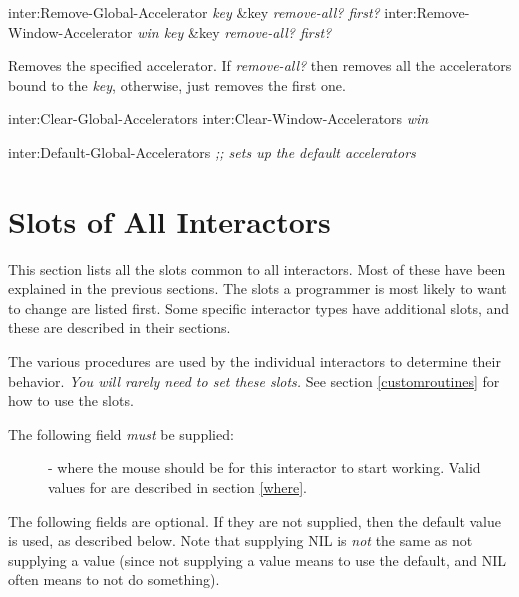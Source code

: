 \begin{programexample}
inter:Remove-Global-Accelerator {\it key} \&key {\it remove-all? first?} \value{function}
inter:Remove-Window-Accelerator {\it win key} \&key {\it remove-all? first?} \value{function}
\end{programexample}
Removes the specified accelerator.  If {\it remove-all?} then removes
all the accelerators bound to the {\it key}, otherwise, just removes the
first one.

\begin{programexample}
inter:Clear-Global-Accelerators \value{function}
inter:Clear-Window-Accelerators {\it win} \value{function}

inter:Default-Global-Accelerators {\it ;; sets up the default accelerators} \value{function}
\end{programexample}



\chapter{Slots of All Interactors}
\label{interslots}

This section lists all the slots common to all interactors.  Most of these
have been explained in the previous sections.  The slots a programmer is most
likely to want to change are listed first.
Some specific interactor types have additional slots, and these are
described in their sections.

The various  procedures are used by the individual interactors
to determine their behavior.  {\it You will rarely need to set these slots.}
See section \ref{customroutines} for how to use the  slots.

The following field {\it must} be supplied:
\begin{description}
\item[] 
- where the mouse should be for this
interactor to start working.  Valid values for  are described in
section \ref{where}.
\end{description}

The following fields are optional.  If they are not supplied, then the
default value is used, as described below.  Note that supplying NIL is
{\it not} the same as not supplying a value (since not supplying a value
means to use the default, and NIL often means to not do something).

